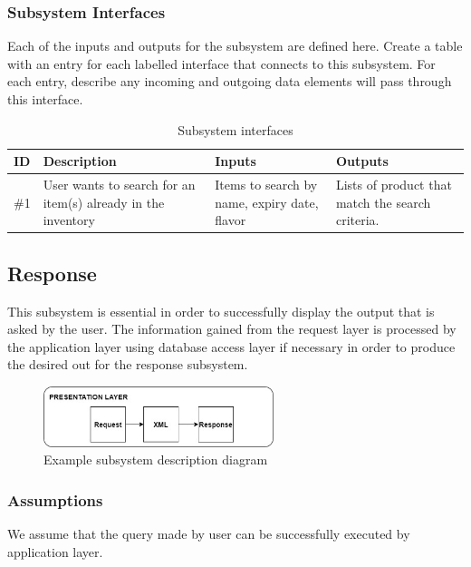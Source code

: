 \subsubsection{Subsystem Interfaces}
Each of the inputs and outputs for the subsystem are defined here. Create a table with an entry for each labelled interface that connects to this subsystem. For each entry, describe any incoming and outgoing data elements will pass through this interface.

\begin {table}[H]
\caption {Subsystem interfaces} 
\begin{center}
    \begin{tabular}{ | p{1cm} | p{6cm} | p{3cm} | p{3cm} |}
    \hline
    ID & Description & Inputs & Outputs \\ \hline
    \#1 & User wants to search for an item(s) already in the inventory & Items to search by name, expiry date, flavor & Lists of product that match the search criteria.  \\ \hline
    \end{tabular}
\end{center}
\end{table}

\subsection{Response}
This subsystem is essential in order to successfully display the output that is asked by the user. The information gained from the request layer is processed by the application layer using database access layer if necessary in order to produce the desired out for the response subsystem.

\begin{figure}[h!]
	\centering
 	\includegraphics[width=0.60\textwidth]{images/Pre.jpg}
 \caption{Example subsystem description diagram}
\end{figure}

\subsubsection{Assumptions}
We assume that the query made by user can be successfully executed by application layer.

